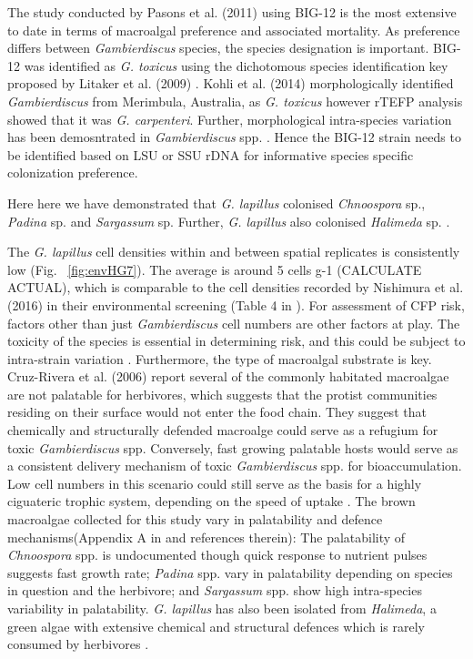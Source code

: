 \documentclass[12pt]{article}
\begin{document}
The study conducted by Pasons et al. (2011) using BIG-12 is the most extensive to date in terms of macroalgal preference and associated mortality. As preference differs between \emph{Gambierdiscus} species, the species designation is important. BIG-12 was identified as \emph{G. toxicus} using  the dichotomous species identification key proposed by Litaker et al. (2009) \cite{litaker2009taxonomy}. Kohli et al. (2014) morphologically identified \emph{Gambierdiscus} from Merimbula, Australia, as \emph{G. toxicus} however rTEFP analysis showed that it was \emph{G. carpenteri}. Further, morphological intra-species variation has been demosntrated in \emph{Gambierdiscus} spp.  \cite{bravo2014cellular,kretzschmar2016characterization,fraga2016gambierdiscus}.
Hence the BIG-12 strain needs to be identified based on LSU or SSU rDNA for informative species specific colonization preference. 

Here here we have demonstrated that \emph{G. lapillus} colonised \emph{Chnoospora} sp., \emph{Padina} sp. and \emph{Sargassum} sp. Further, \emph{G. lapillus} also colonised \emph{Halimeda} sp. \cite{kretzschmar2016characterization}.

The \emph{G. lapillus} cell densities within and between spatial replicates is consistently low (Fig. ~\ref{fig:envHG7}). The average is around 5 cells g-1 (CALCULATE ACTUAL), which is comparable to the cell densities recorded by Nishimura et al. (2016) in their environmental screening (Table 4 in \cite{nishimura2016quantitative}). For assessment of CFP risk, factors other than just \emph{Gambierdiscus} cell numbers are other factors at play. The toxicity of the species is essential in determining risk, and this could be subject to intra-strain variation \cite{kretzschmar2016characterization}. Furthermore, the type of macroalgal substrate is key. Cruz-Rivera et al. (2006) report several of the commonly habitated macroalgae are not palatable for herbivores, which suggests that the protist communities residing on their surface would not enter the food chain. They suggest that chemically and structurally defended macroalge could serve as a refugium for toxic \emph{Gambierdiscus} spp. Conversely, fast growing palatable hosts would serve as a consistent delivery mechanism of toxic \emph{Gambierdiscus} spp. for bioaccumulation. Low cell numbers in this scenario could still serve as the basis for a highly ciguateric trophic system, depending on the speed of uptake \cite{cruz2006macroalgal}.
The brown macroalgae collected for this study vary in palatability and defence mechanisms(Appendix A in \cite{cruz2006macroalgal} and references therein): The palatability of \emph{Chnoospora} spp. is undocumented though quick response to nutrient pulses suggests fast growth rate; \emph{Padina} spp. vary in palatability depending on species in question and the herbivore; and \emph{Sargassum} spp. show high intra-species variability in palatability. \emph{G. lapillus} has also been isolated from  \emph{Halimeda}, a green algae with extensive chemical and structural defences which is rarely consumed by herbivores \cite{kretzschmar2016characterization,cruz2006macroalgal}.
\end{document}
